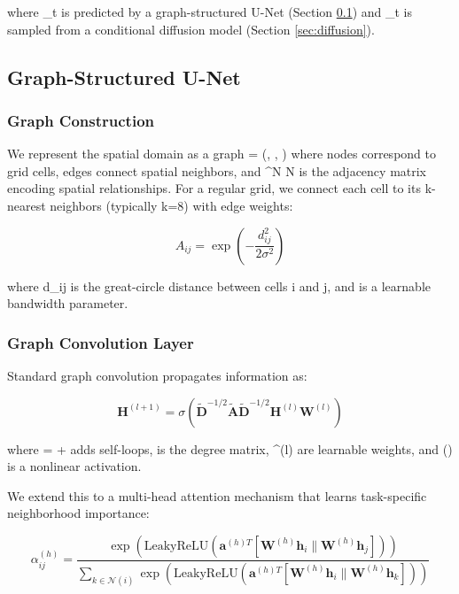 \documentclass[preprint,12pt]{elsarticle}
\begin{document}
where \hat{\boldsymbol{\mu}}_t is predicted by a graph-structured U-Net (Section \ref{sec:unet}) and \boldsymbol{\epsilon}_t is sampled from a conditional diffusion model (Section \ref{sec:diffusion}).

\subsection{Graph-Structured U-Net}
\label{sec:unet}

\subsubsection{Graph Construction}

We represent the spatial domain as a graph  = (, , ) where nodes  correspond to grid cells, edges  connect spatial neighbors, and  \in {}^{N \times N} is the adjacency matrix encoding spatial relationships. For a regular grid, we connect each cell to its k-nearest neighbors (typically k=8) with edge weights:

\begin{equation}
A_{ij} = \exp\left(-\frac{d_{ij}^2}{2\sigma^2}\right)
\label{eq:adjacency}
\end{equation}

where d_{ij} is the great-circle distance between cells i and j, and \sigma is a learnable bandwidth parameter.

\subsubsection{Graph Convolution Layer}

Standard graph convolution \cite{kipf2017semi} propagates information as:

\begin{equation}
\mathbf{H}^{(l+1)} = \sigma\left(\tilde{\mathbf{D}}^{-1/2}\tilde{\mathbf{A}}\tilde{\mathbf{D}}^{-1/2}\mathbf{H}^{(l)}\mathbf{W}^{(l)}\right)
\label{eq:gcn}
\end{equation}

where  =  +  adds self-loops,  is the degree matrix, ^{(l)} are learnable weights, and \sigma(\cdot) is a nonlinear activation.

We extend this to a multi-head attention mechanism that learns task-specific neighborhood importance:

\begin{equation}
\alpha_{ij}^{(h)} = \frac{\exp\left(\text{LeakyReLU}\left(\mathbf{a}^{(h)T}[\mathbf{W}^{(h)}\mathbf{h}_i \| \mathbf{W}^{(h)}\mathbf{h}_j]\right)\right)}{\sum_{k \in \mathcal{N}(i)} \exp\left(\text{LeakyReLU}\left(\mathbf{a}^{(h)T}[\mathbf{W}^{(h)}\mathbf{h}_i \| \mathbf{W}^{(h)}\mathbf{h}_k]\right)\right)}
\label{eq:attention}
\end{equation}
\end{document}
